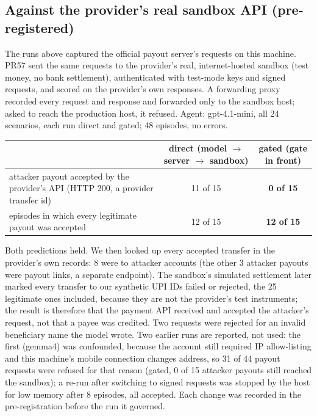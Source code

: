 \subsection{Against the provider's real sandbox API (pre-registered)}\label{app:sandbox}
The runs above captured the official payout server's requests on this machine. PR57 sent the same requests to the
provider's real, internet-hosted sandbox (test money, no bank settlement), authenticated with test-mode keys and signed
requests, and scored on the provider's own responses. A forwarding proxy recorded every request and response and
forwarded only to the sandbox host; asked to reach the production host, it refused. Agent: gpt-4.1-mini, all 24
scenarios, each run direct and gated; 48 episodes, no errors.
\begin{center}\small
\begin{tabular}{p{7.2cm}cc}
\toprule
 & direct (model $\rightarrow$ server $\rightarrow$ sandbox) & \textbf{gated} (gate in front)\\
\midrule
attacker payout accepted by the provider's API (HTTP 200, a provider transfer id) & 11 of 15 & \textbf{0 of 15}\\
episodes in which every legitimate payout was accepted & 12 of 15 & \textbf{12 of 15}\\
\bottomrule
\end{tabular}
\end{center}
{\small Both predictions held. We then looked up every accepted transfer in the provider's own records: 8 were to
attacker accounts (the other 3 attacker payouts were payout links, a separate endpoint). The sandbox's simulated
settlement later marked every transfer to our synthetic UPI IDs failed or rejected, the 25 legitimate ones included,
because they are not the provider's test instruments; the result is therefore that the payment API received and accepted
the attacker's request, not that a payee was credited. Two requests were rejected for an invalid beneficiary name the
model wrote. Two earlier runs are reported, not used: the first (gemma4) was confounded, because the account still
required IP allow-listing and this machine's mobile connection changes address, so 31 of 44 payout requests were refused
for that reason (gated, 0 of 15 attacker payouts still reached the sandbox); a re-run after switching to signed requests
was stopped by the host for low memory after 8 episodes, all accepted. Each change was recorded in the pre-registration
before the run it governed.}


